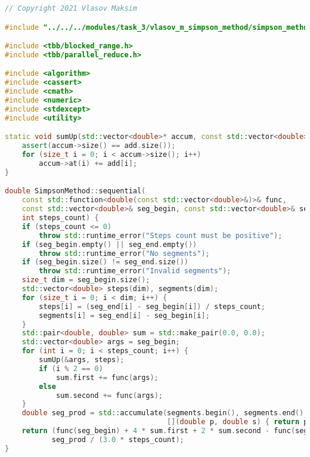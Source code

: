 \documentclass{report}
\begin{document}
\begin{lstlisting}[language=C++]
// Copyright 2021 Vlasov Maksim

#include "../../../modules/task_3/vlasov_m_simpson_method/simpson_method.h"

#include <tbb/blocked_range.h>
#include <tbb/parallel_reduce.h>

#include <algorithm>
#include <cassert>
#include <cmath>
#include <numeric>
#include <stdexcept>
#include <utility>

static void sumUp(std::vector<double>* accum, const std::vector<double>& add) {
    assert(accum->size() == add.size());
    for (size_t i = 0; i < accum->size(); i++)
        accum->at(i) += add[i];
}

double SimpsonMethod::sequential(
    const std::function<double(const std::vector<double>&)>& func,
    const std::vector<double>& seg_begin, const std::vector<double>& seg_end,
    int steps_count) {
    if (steps_count <= 0)
        throw std::runtime_error("Steps count must be positive");
    if (seg_begin.empty() || seg_end.empty())
        throw std::runtime_error("No segments");
    if (seg_begin.size() != seg_end.size())
        throw std::runtime_error("Invalid segments");
    size_t dim = seg_begin.size();
    std::vector<double> steps(dim), segments(dim);
    for (size_t i = 0; i < dim; i++) {
        steps[i] = (seg_end[i] - seg_begin[i]) / steps_count;
        segments[i] = seg_end[i] - seg_begin[i];
    }
    std::pair<double, double> sum = std::make_pair(0.0, 0.0);
    std::vector<double> args = seg_begin;
    for (int i = 0; i < steps_count; i++) {
        sumUp(&args, steps);
        if (i % 2 == 0)
            sum.first += func(args);
        else
            sum.second += func(args);
    }
    double seg_prod = std::accumulate(segments.begin(), segments.end(), 1.0,
                                      [](double p, double s) { return p * s; });
    return (func(seg_begin) + 4 * sum.first + 2 * sum.second - func(seg_end)) *
           seg_prod / (3.0 * steps_count);
}


\end{lstlisting}
\end{document}

